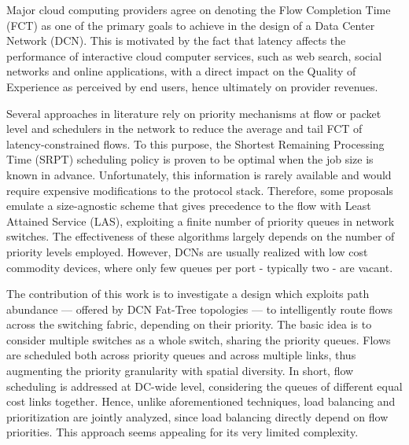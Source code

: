 \abstract
Major cloud computing providers agree on denoting the Flow Completion Time (FCT) as one of the primary goals to achieve in the design of a Data Center Network (DCN). This is motivated by the fact that latency affects the performance of interactive cloud computer services, such as web search, social networks and online applications, with a direct impact on the Quality of Experience as perceived by end users, hence ultimately on provider revenues.

Several approaches in literature rely on priority mechanisms at flow or packet level and schedulers in the network to reduce the average and tail FCT of latency-constrained flows. 
To this purpose, the Shortest Remaining Processing Time (SRPT) scheduling policy is proven to be optimal when the job size is known in advance. Unfortunately, this information is rarely available and would require expensive modifications to the protocol stack. Therefore, some proposals emulate a size-agnostic scheme that gives precedence to the flow with Least Attained Service (LAS), exploiting a finite number of priority queues in network switches. The effectiveness of these algorithms largely depends on the number of priority levels employed. However, DCNs are usually realized with low cost commodity devices, where only few queues per port - typically two - are vacant.

The contribution of this work is to investigate a design which exploits path abundance --- offered by DCN Fat-Tree topologies --- to intelligently route flows across the switching fabric, depending on their priority. The basic idea is to consider multiple switches as a whole switch, sharing the priority queues. Flows are scheduled both across priority queues and across multiple links, thus augmenting the priority granularity with spatial diversity. 
In short, flow scheduling is addressed at DC-wide level, considering the queues of different equal cost links together. Hence, unlike aforementioned techniques, load balancing and prioritization are jointly analyzed, since load balancing directly depend on flow priorities. This approach seems appealing for its very limited complexity. 

